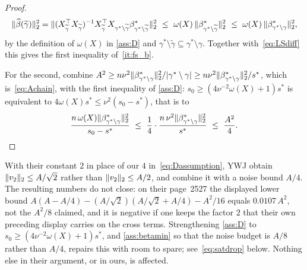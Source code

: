 \begin{proof}
\begin{equation*}
        \lVert\widehat\beta(\widetilde\gamma)\rVert_2^{2}
        =\lVert(X_{\widetilde\gamma}^{\top}X_{\widetilde\gamma})^{-1}
            X_{\widetilde\gamma}^{\top}
            X_{\gamma^{\ast}\setminus\widetilde\gamma}
            \beta^\ast_{\gamma^{\ast}\setminus\widetilde\gamma}\rVert_2^{2}
        \ \leq\ \omega(X)\,
        \lVert\beta^\ast_{\gamma^{\ast}
        \setminus\widetilde\gamma}\rVert_2^{2}
        \ \leq\ \omega(X)\,
        \lVert\beta^\ast_{\gamma^{\ast}\setminus\gamma}\rVert_2^{2},
    \end{equation*}
    by the definition of $\omega(X)$ in \cref{ass:D} and
    $\gamma^{\ast}\setminus\widetilde\gamma\subseteq
    \gamma^{\ast}\setminus\gamma$. Together with~\eqref{eq:LSdiff} this
    gives the first inequality of~\ref{it:fs_b}.

    For the second, combine
    $A^{2}\geq n\nu^{2}
    \lVert\beta^\ast_{\gamma^{\ast}\setminus\gamma}\rVert_2^{2}/
    \lvert\gamma^{\ast}\setminus\gamma\rvert\geq
    n\nu^{2}\lVert\beta^\ast_{\gamma^{\ast}\setminus\gamma}\rVert_2^{2}/
    s^{\ast}$, which is~\eqref{eq:Achain}, with the first inequality of
    \cref{ass:D}: $s_0\geq(4\nu^{-2}\omega(X)+1)s^{\ast}$ is equivalent to
    $4\omega(X)s^{\ast}\leq\nu^{2}(s_0-s^{\ast})$, that is to
    \begin{equation*}
        \frac{n\,\omega(X)
        \lVert\beta^\ast_{\gamma^{\ast}\setminus\gamma}\rVert_2^{2}}
        {s_0-s^{\ast}}
        \ \leq\ \frac14\cdot
        \frac{n\,\nu^{2}
            \lVert\beta^\ast_{\gamma^{\ast}\setminus\gamma}\rVert_2^{2}}
        {s^{\ast}}
        \ \leq\ \frac{A^{2}}{4} . \qedhere
    \end{equation*}
\end{proof}


\begin{remark}
    \label{rem:ywj_constant}
    With their constant $2$ in place of our $4$ in~\eqref{eq:Dassumption},
    YWJ obtain $\lVert v_2\rVert_2\leq A/\sqrt2$ rather than
    $\lVert v_2\rVert_2\leq A/2$, and combine it with a noise bound $A/4$. The
    resulting numbers do not close: on their page~2527 the displayed lower
    bound $A(A-A/4)-(A/\sqrt2)(A/\sqrt2+A/4)-A^{2}/16$ equals
    $0.0107\,A^{2}$, not the $A^{2}/8$ claimed, and it is negative if one
    keeps the factor $2$ that their own preceding display carries on the
    cross terms. Strengthening \cref{ass:D} to
    $s_0\geq(4\nu^{-2}\omega(X)+1)s^{\ast}$, and \cref{ass:betamin} so
    that the noise budget is $A/8$ rather than $A/4$, repairs this with
    room to spare; see~\eqref{eq:satdrop} below. Nothing else in their
    argument, or in ours, is affected.
\end{remark}

